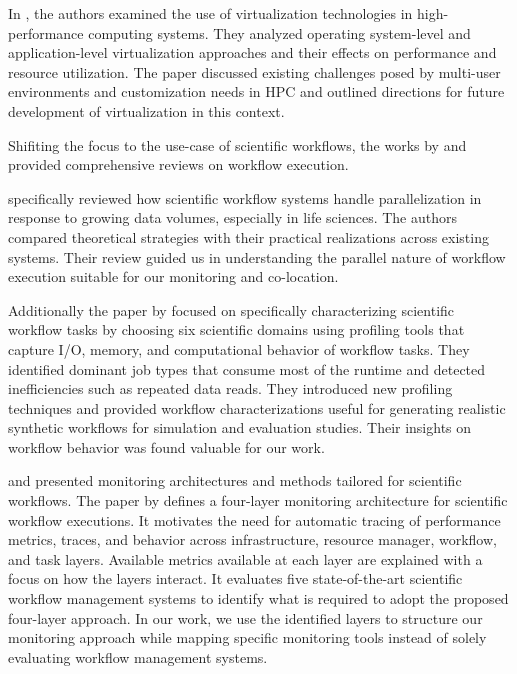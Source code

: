 In \cite{9653557}, the authors examined the use of virtualization technologies in high-performance computing systems. They analyzed operating system-level and application-level virtualization approaches and their effects on performance and resource utilization. The paper discussed existing challenges posed by multi-user environments and customization needs in HPC and outlined directions for future development of virtualization in this context.

Shifiting the focus to the use-case of scientific workflows, the works by \cite{Bux2013} and \cite{JUVE2013682} provided comprehensive reviews on workflow execution.

\cite{Bux2013} specifically reviewed how scientific workflow systems handle parallelization in response to growing data volumes, especially in life sciences. The authors compared theoretical strategies with their practical realizations across existing systems. Their review guided us in understanding the parallel nature of workflow execution suitable for our monitoring and co-location.

Additionally the paper by \cite{JUVE2013682} focused on specifically characterizing scientific workflow tasks by choosing six scientific domains using profiling tools that capture I/O, memory, and computational behavior of workflow tasks. They identified dominant job types that consume most of the runtime and detected inefficiencies such as repeated data reads. They introduced new profiling techniques and provided workflow characterizations useful for generating realistic synthetic workflows for simulation and evaluation studies. Their insights on workflow behavior was found valuable for our work.

\cite{Bader_2022} and \cite{Witzke2024} presented monitoring architectures and methods tailored for scientific workflows.
The paper by \cite{Bader_2022} defines a four-layer monitoring architecture for scientific workflow executions. It motivates the need for automatic tracing of performance metrics, traces, and behavior across infrastructure, resource manager, workflow, and task layers. Available metrics available at each layer are explained with a focus on how the layers interact. It evaluates five state-of-the-art scientific workflow management systems to identify what is required to adopt the proposed four-layer approach. In our work, we use the identified layers to structure our monitoring approach while mapping specific monitoring tools instead of solely evaluating workflow management systems.


